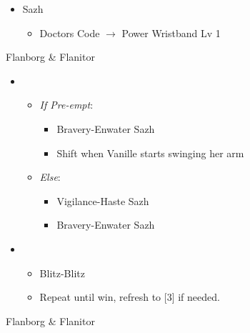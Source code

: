 \begin{paracol}{2}
\begin{menu}
\begin{itemize}
			\equip
			\begin{itemize}
				\item Sazh
				      \begin{itemize}
					      \item Doctors Code $\rightarrow$ Power Wristband Lv 1
				      \end{itemize}
			\end{itemize}
		\end{itemize}
	\end{menu}
	\switchcolumn*
	\begin{battle}{Flanborg \& Flanitor}
		\begin{itemize}
			\item \first
			      \begin{itemize}
				      \item \textit{If Pre-empt}:
				            \begin{itemize}
					            \item Bravery-Enwater Sazh
					            \item Shift when Vanille starts swinging her arm
				            \end{itemize}
				      \item \textit{Else}:
				            \begin{itemize}
					            \item Vigilance-Haste Sazh
					            \item Bravery-Enwater Sazh
				            \end{itemize}
			      \end{itemize}
			\item \sixth
			      \begin{itemize}
				      \item Blitz-Blitz
				      \item Repeat until win, refresh to [3] if needed.
			      \end{itemize}
		\end{itemize}
		 
	\end{battle}
	\switchcolumn
	\begin{battle}{Flanborg \& Flanitor}
		\begin{itemize}


\end{itemize}
\end{battle}
\end{paracol}
